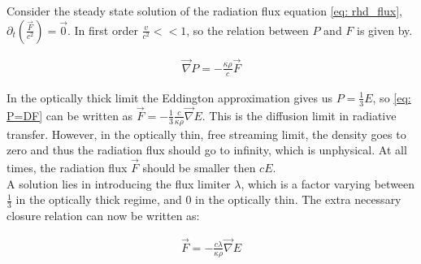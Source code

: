 Consider the steady state solution of the radiation flux equation \eqref{eq: rhd_flux}, $\partial_t \left(\frac{\vec{F}}{c^2} \right) = \vec{0}$. In first order $\frac{v}{c^2} << 1$, so the relation between $P$ and $F$ is given by.

\begin{align}
\vec{\nabla} P = - \frac{\kappa \rho}{c} \vec{F} \label{eq: P=DF}
\end{align}

In the optically thick limit the Eddington approximation gives us $P = \frac{1}{3}E$, so \eqref{eq: P=DF} can be written as $\vec{F} = -\frac{1}{3}\frac{c}{\kappa \rho} \vec{\nabla}E$. This is the diffusion limit in radiative transfer. However, in the optically thin, free streaming limit, the density goes to zero and thus the radiation flux should go to infinity, which is unphysical. At all times, the radiation flux $\vec{F}$ should be smaller then $cE$.\\
 A solution lies in introducing the flux limiter $\lambda$, which is a factor varying between $\frac{1}{3}$ in the optically thick regime, and $0$ in the optically thin. The extra necessary closure relation can now be written as:

\begin{align}
\vec{F} = -\frac{c\lambda}{\kappa \rho} \vec{\nabla}E \label{eq: fld_closing}
\end{align}

